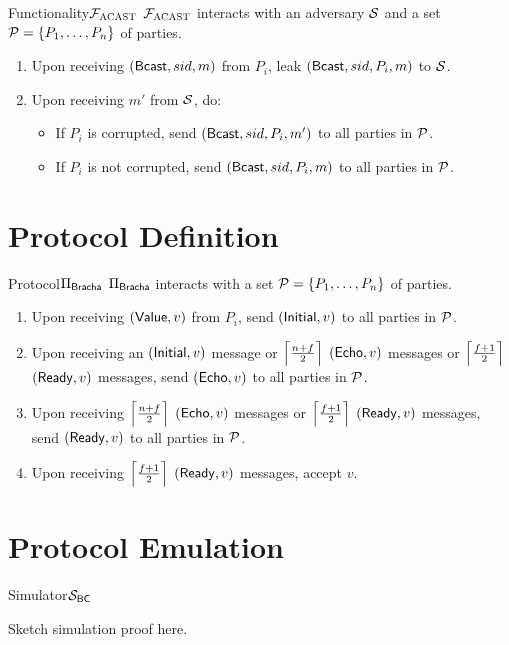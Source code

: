 \documentclass{llncs}
\begin{document}
\begin{boxdef}{Functionality}{$\mathcal{{F}}_{\textsc{ACAST}}$}
  $\mathcal{{F}}_{\textsc{ACAST}}$ interacts with an adversary $\mathcal{{S}}$ and a set $\mathcal{{P}} = \{
  P_1, \ldots, P_n \}$ of parties.
  \begin{enumerate}
    \item Upon receiving $({\sf Bcast}, sid, m)$ from $P_i$, leak $({\sf Bcast},
  sid, P_i, m)$ to $\mathcal{{S}}$.
  
    \item Upon receiving $m'$ from $\mathcal{{S}}$, do:
    
    \begin{itemize}
      \item If $P_i$ is corrupted, send $({\sf Bcast}, sid, P_i, m')$ to all
  parties in $\mathcal{{P}}$.
  
      \item If $P_i$ is not corrupted, send $({\sf Bcast}, sid, P_i, m)$ to all
  parties in $\mathcal{{P}}$.
    \end{itemize}
  \end{enumerate}
\end{boxdef}

\section{Protocol Definition}

\begin{boxdef}{Protocol}{$\Pi_{\sf Bracha}$}
  $\Pi_{\sf Bracha}$ interacts with a set $\mathcal{{P}} = \{ P_1, \ldots, P_n \}$ of parties.
  \begin{enumerate}
    \item Upon receiving $({\sf Value}, v)$ from $P_i$, send $({\sf Initial},
  v)$ to all parties in $\mathcal{{P}}$.
  
    \item Upon receiving an $({\sf Initial}, v)$ message or
  $\left\lceil \frac{n+f}{2} \right\rceil$ $({\sf Echo}, v)$ messages or $\left\lceil \frac{f+1}{2} \right\rceil$
  $({\sf Ready}, v)$ messages, send $({\sf Echo}, v)$ to all parties in
  $\mathcal{{P}}$.

    \item Upon receiving $\left\lceil \frac{n+f}{2} \right\rceil$ $({\sf Echo}, v)$ messages or
  $\left\lceil \frac{f+1}{2} \right\rceil$ $({\sf Ready}, v)$ messages, send $({\sf Ready}, v)$ to
  all parties in $\mathcal{{P}}$.

    \item Upon receiving $\left\lceil \frac{f+1}{2} \right\rceil$ $({\sf Ready}, v)$ messages,
    accept $v$.
  \end{enumerate}
\end{boxdef}

\section{Protocol Emulation}

\begin{boxdef}{Simulator}{$\mathcal{{S}}_{\sf BC}$}

\end{boxdef}

\begin{proof-sketch}
Sketch simulation proof here.
\end{proof-sketch}
    


\end{document}
